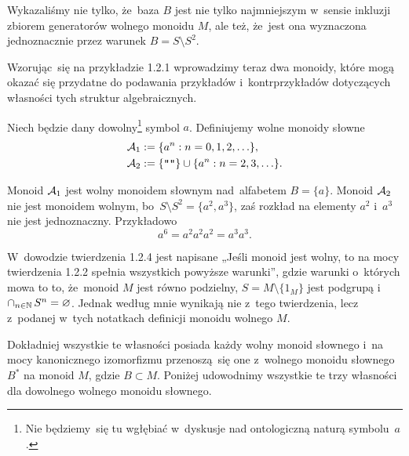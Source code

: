 \documentclass[a4paper,11pt]{article}
\begin{document}
Wykazaliśmy nie tylko, że~baza $B$ jest nie tylko najmniejszym w~sensie
inkluzji zbiorem generatorów wolnego monoidu $M$, ale też, że~jest ona
wyznaczona jednoznacznie przez warunek $B = S \setminus S^{ 2 }$.

\vspace{\spaceFour}





\start {} Wzorując~się na przykładzie 1.2.1 wprowadzimy teraz dwa
monoidy, które mogą okazać się przydatne do podawania przykładów
i~kontrprzykładów dotyczących własności tych struktur algebraicznych.

Niech będzie dany dowolny\footnote{Nie będziemy~się tu wgłębiać w~dyskusje
  nad ontologiczną naturą symbolu~$a$.} symbol $a$. Definiujemy wolne
monoidy słowne
\begin{align}
  \mathcal{A}_{ 1 } &:= \{ a^{ n } : n = 0, 1, 2, \ldots \}, \\
  \mathcal{A}_{ 2 } &:= \{ \texttt{""} \} \cup \{ a^{ n } : n = 2, 3, \ldots \}.
\end{align}

Monoid $\mathcal{A}_{ 1 }$ jest wolny monoidem słownym nad~alfabetem $B = \{ a \}$.
Monoid $\mathcal{A}_{ 2 }$ nie jest monoidem wolnym,
bo~$S \setminus S^{ 2 } = \{ a^{ 2 }, a^{ 3 } \}$, zaś rozkład na elementy $a^{ 2 }$
i~$a^{ 3 }$ nie jest jednoznaczny. Przykładowo
\begin{equation}
  \label{eq:Forys-Forys-???}
  a^{ 6 } = a^{ 2 } a^{ 2 } a^{ 2 } = a^{ 3 } a^{ 3 }.
\end{equation}

\vspace{\spaceFour}





\start {} W~dowodzie twierdzenia 1.2.4 jest napisane „Jeśli monoid
jest wolny, to na mocy twierdzenia 1.2.2 spełnia wszystkich powyższe
warunki”, gdzie warunki o~których mowa to to, że~monoid $M$ jest równo
podzielny, $S = M \setminus \{ 1_{ M } \}$ jest podgrupą
i~$\cap_{ n \in \mathbb{N} } \, S^{ n } = \varnothing$. Jednak według mnie wynikają nie z~tego
twierdzenia, lecz z~podanej w~tych notatkach definicji monoidu wolnego $M$.

Dokładniej wszystkie te własności posiada każdy wolny monoid słownego
i~na mocy kanonicznego izomorfizmu przenoszą~się one z~wolnego monoidu
słownego $B^{ * }$ na monoid $M$, gdzie $B \subset M$. Poniżej udowodnimy
wszystkie te trzy własności dla dowolnego wolnego monoidu słownego.
\end{document}
